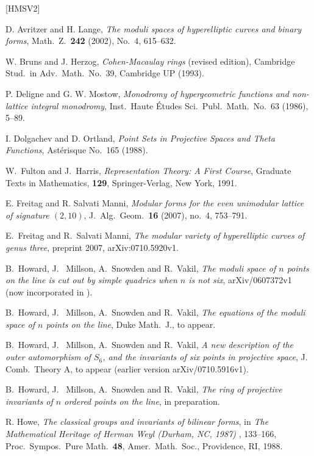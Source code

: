 \documentclass{amsart}
\theoremstyle{definition}
\theoremstyle{remark}
\begin{document}
\begin{thebibliography}{[HMSV2]}

 D. Avritzer and H. Lange, {\em The moduli spaces of
hyperelliptic curves and binary forms}, Math.\ Z.\ {\bf 242} (2002), No.\ 4,
615--632.

 W. Bruns and J. Herzog, {\em Cohen-Macaulay rings}
(revised edition), Cambridge Stud.\ in Adv.\ Math.\ No.\ 39, Cambridge
UP (1993).

 P. Deligne and G. W. Mostow, {\em Monodromy of hypergeometric
functions and non-lattice integral monodromy}, Inst.\ Haute \'Etudes Sci.\
Publ.\ Math.\ No.\ 63 (1986), 5--89.

  I. Dolgachev and D. Ortland, {\em Point Sets in Projective
Spaces and Theta Functions}, Ast\'erisque No.\ 165 (1988).

W.\ Fulton and J.\ Harris, \emph{Representation Theory: A First Course},
Graduate Texts in Mathematics, {\bf 129}, Springer-Verlag, New York, 1991.

 E. Freitag and R. Salvati Manni, {\em Modular forms for the
even unimodular lattice of signature $(2,10)$}, J.\ Alg.\ Geom.\ {\bf 16}
(2007), no.\ 4, 753--791.

E.\ Freitag and R.\ Salvati Manni, {\em The modular variety of hyperelliptic
curves of genus three}, preprint 2007, arXiv:0710.5920v1.

B.\ Howard, J. \ Millson, A.\ Snowden and R.\ Vakil, {\em The moduli space of
$n$ points on the line is cut out by simple quadrics when $n$ is not six},
arXiv/0607372v1 (now incorporated in \cite{hmsv1}).

B.\ Howard, J. \ Millson, A.\ Snowden and R.\ Vakil, {\em The equations of the
moduli space of $n$ points on the line}, Duke Math.\ J., to appear.

B.\ Howard, J. \ Millson, A.\ Snowden and R.\ Vakil, {\em A new description of
the outer automorphism of $S_6$, and the invariants of six points in projective
space}, J. Comb.\ Theory A, to appear (earlier version arXiv/0710.5916v1).

B.\ Howard, J. \ Millson, A.\ Snowden and R.\ Vakil, {\em The ring of
projective invariants of $n$ ordered points on the line}, in preparation.

 R. Howe, {\em The classical groups and invariants of
bilinear forms}, in {\em The Mathematical Heritage of Herman Weyl (Durham, NC,
1987) }, 133--166, Proc.\ Sympos.\ Pure Math.\ {\bf 48}, Amer.\ Math.\ Soc.,
Providence, RI, 1988.


\end{thebibliography}
\end{document}
